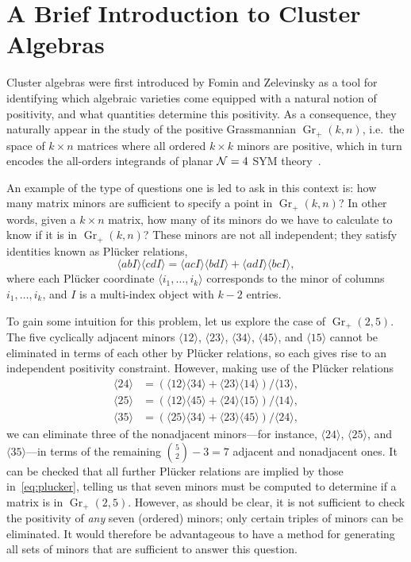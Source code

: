 \documentclass[11pt]{article}
\DeclareMathOperator{\Gr}{Gr}
\def\ket#1{\langle #1 \rangle}
\begin{document}
\section{A Brief Introduction to Cluster Algebras} \label{sec:brief_intro}

Cluster algebras were first introduced by Fomin and Zelevinsky \cite{1021.16017} as a tool for identifying which algebraic varieties come equipped with a natural notion of positivity, and what quantities determine this positivity. As a consequence, they naturally appear in the study of the positive Grassmannian $\Gr_{+}(k,n)$, i.e.~the space of $k\times n$ matrices where all ordered $k\times k$ minors are positive, which in turn encodes the all-orders integrands of planar ${\cal N} = 4$ SYM theory~\cite{ArkaniHamed:2012nw}.

An example of the type of questions one is led to ask in this context is: how many matrix minors are sufficient to specify a point in $\Gr_+(k,n)$? In other words, given a $k \times n$ matrix, how many of its minors do we have to calculate to know if it is in $\Gr_+(k,n)$? These minors are not all independent; they satisfy identities known as Pl\"ucker relations,
\begin{equation}
  \label{eq:plucker-rel}
  \ket{abI} \ket{cdI} = \ket{acI} \ket{bdI} + \ket{adI}\ket{bcI},
\end{equation}
where each Pl\"ucker coordinate $\ket{i_1,\ldots,i_k}$ corresponds to the minor of columns $i_1, \ldots,i_k$, and $I$ is a multi-index object with $k-2$ entries.

To gain some intuition for this problem, let us explore the case of $\Gr_+(2,5)$. The five cyclically adjacent minors $\ket{12}$, $\ket{23}$, $\ket{34}$, $\ket{45}$, and $\ket{15}$ cannot be eliminated in terms of each other by Pl\"ucker relations, so each gives rise to an independent positivity constraint. However, making use of the Pl\"ucker relations 
\begin{equation} \label{eq:plucker}
\begin{split}
	\ket{24} &= (\ket{12}\ket{34} + \ket{23}\ket{14})/\ket{13},\\
	\ket{25} &= (\ket{12}\ket{45} + \ket{24}\ket{15})/\ket{14},\\
	\ket{35} &= (\ket{25}\ket{34} + \ket{23}\ket{45})/\ket{24},
\end{split}	 	
\end{equation} 
we can eliminate three of the nonadjacent minors---for instance, $\ket{24}$, $\ket{25}$, and $\ket{35}$---in terms of the remaining ${{5}\choose{2}} - 3 = 7$ adjacent and nonadjacent ones. It can be checked that all further Pl\"ucker relations are implied by those in~\eqref{eq:plucker}, telling us that seven minors must be computed to determine if a matrix is in $\Gr_+(2,5)$. However, as should be clear, it is not sufficient to check the positivity of {\it any} seven (ordered) minors; only certain triples of minors can be eliminated. It would therefore be advantageous to have a method for generating all sets of minors that are sufficient to answer this question.
\end{document}
